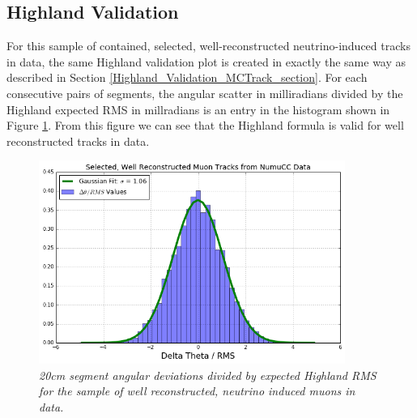 \subsection{Highland Validation}\label{Highland_Validation_DataRecoTrack_section}
For this sample of contained, selected, well-reconstructed neutrino-induced tracks in {\ub} data, the same Highland validation plot is created in exactly the same way as described in Section \ref{Highland_Validation_MCTrack_section}. For each consecutive pairs of segments, the angular scatter in milliradians divided by the Highland expected RMS in millradians is an entry in the histogram shown in Figure \ref{Highland_validation_DataRecoTracks_fig}. From this figure we can see that the Highland formula is valid for well reconstructed tracks in data.

\begin{figure}[h!]
\begin{center}
\includegraphics[width=100mm]{Figures/Highland_validation_DataRecoTracks_goodhandscan.png}
\end{center}
\caption{\textit{20cm segment angular deviations divided by expected Highland RMS for the sample of well reconstructed, neutrino induced muons in {\ub} data.}}
\label{Highland_validation_DataRecoTracks_fig}
\end{figure}

